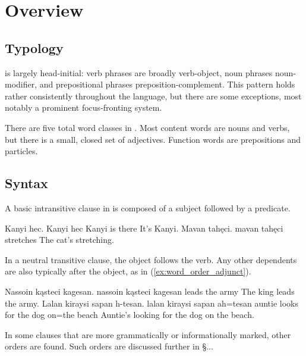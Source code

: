 \chapter{Overview}
\section{Typology}
\langname{} is largely head-initial: verb phrases are broadly verb-object, noun phrases noun-modifier, and prepositional phrases preposition-complement. This pattern holds rather consistently throughout the language, but there are some exceptions, most notably a prominent focus-fronting system.

There are five total word classes in \langname{}. Most content words are nouns and verbs, but there is a small, closed set of adjectives. Function words are prepositions and particles.

\section{Syntax}
A basic intransitive clause in \langname{} is composed of a subject followed by a predicate.  

\begin{examples}
    \ex
        \script Kanyi hec.
        \bits Kanyi hec
        \gloss Kanyi {is there}
        \tr It's Kanyi.
    \ex
        \script Mavan tahęci.
        \bits mavan tahęci
         stretches
        \tr The cat's stretching.
\end{examples}

In a neutral transitive clause, the object follows the verb. Any other dependents are also typically after the object, as in (\ref{ex:word_order_adjunct}).

\begin{examples}
    \ex
        \script Nassoin kąsteci kagesan.
        \bits nassoin kąsteci kagesan
         leads {the army}
        \tr The king leads the army.
    \ex \label{ex:word_order_adjunct}
        \script Lalan kiraysi sapan h-tesan.
        \bits lalan kiraysi sapan ah=tesan
        \gloss auntie {looks for} {the dog} on={the beach}
        \tr Auntie's looking for the dog on the beach.
\end{examples}

In some clauses that are more grammatically or informationally marked, other orders are found. Such orders are discussed further in §...

